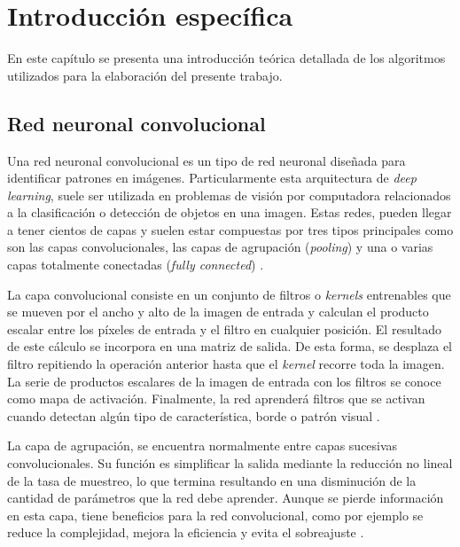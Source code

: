 \chapter{Introducción específica} %

\label{Chapter2}

En este capítulo se presenta una introducción teórica detallada de los algoritmos utilizados para la elaboración del presente trabajo.

\section{Red neuronal convolucional}

Una red neuronal convolucional es un tipo de red neuronal diseñada para identificar patrones en imágenes. Particularmente esta arquitectura de \textit{deep learning}, suele ser utilizada en problemas de visión por computadora relacionados a la clasificación o detección de objetos en una imagen. Estas redes, pueden llegar a tener cientos de capas y suelen estar compuestas por tres tipos principales como son las capas convolucionales, las capas de agrupación (\textit{pooling}) y una o varias capas totalmente conectadas (\textit{fully connected}) \cite{WEBSITE:2}\cite{WEBSITE:3}\cite{WEBSITE:4}.

La capa convolucional consiste en un conjunto de filtros o \textit{kernels} entrenables que se mueven por el ancho y alto de la imagen de entrada y calculan el producto escalar entre los píxeles de entrada y el filtro en cualquier posición. El resultado de este cálculo se incorpora en una matriz de salida. De esta forma, se desplaza el filtro repitiendo la operación anterior hasta que el \textit{kernel} recorre toda la imagen. La serie de productos escalares de la imagen de entrada con los filtros se conoce como mapa de activación. Finalmente, la red aprenderá filtros que se activan cuando detectan algún tipo de característica, borde o patrón visual \cite{WEBSITE:3}\cite{WEBSITE:4}.

La capa de agrupación, se encuentra normalmente entre capas sucesivas convolucionales. Su función es simplificar la salida mediante la reducción no lineal de la tasa de muestreo, lo que termina resultando en una disminución de la cantidad de parámetros que la red debe aprender. Aunque se pierde información en esta capa, tiene beneficios para la red convolucional, como por ejemplo se reduce la complejidad, mejora la eficiencia y evita el sobreajuste \cite{WEBSITE:3}\cite{WEBSITE:4}.

